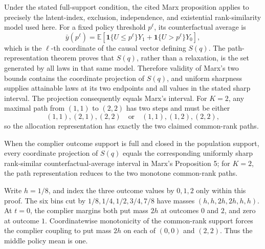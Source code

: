Under the stated full-support condition, the cited Marx proposition applies to precisely the latent-index, exclusion, independence, and existential rank-similarity model used here.  For a fixed policy threshold \(p^\ell\), its counterfactual average is
\[
\bar y(p^\ell)=\mathbb E[\mathbf 1\{U\le p^\ell\}Y_1+\mathbf 1\{U>p^\ell\}Y_0],
\]
which is the \(\ell\)-th coordinate of the causal vector defining \(S(q)\).  The path-representation theorem proves that \(S(q)\), rather than a relaxation, is the set generated by all laws in that same model.  Therefore validity of Marx's two bounds contains the coordinate projection of \(S(q)\), and uniform sharpness supplies attainable laws at its two endpoints and all values in the stated sharp interval.  The projection consequently equals Marx's interval.  For \(K=2\), any maximal path from \((1,1)\) to \((2,2)\) has two steps and must be either
\[
(1,1),(2,1),(2,2)
\quad\text{or}\quad
(1,1),(1,2),(2,2),
\]
so the allocation representation has exactly the two claimed common-rank paths.

When the complier outcome support is full and closed in the population support, every coordinate projection of \(S(q)\) equals the corresponding uniformly sharp rank-similar counterfactual-average interval in Marx's Proposition 5; for \(K=2\), the path representation reduces to the two monotone common-rank paths.

Write \(h=1/8\), and index the three outcome values by \(0,1,2\) only within this proof.  The six bins cut by \(1/8,1/4,1/2,3/4,7/8\) have masses \((h,h,2h,2h,h,h)\).  At \(t=0\), the complier margins both put mass \(2h\) at outcomes \(0\) and \(2\), and zero at outcome \(1\).  Coordinatewise monotonicity of the common-rank support forces the complier coupling to put mass \(2h\) on each of \((0,0)\) and \((2,2)\).  Thus the middle policy mean is one.

